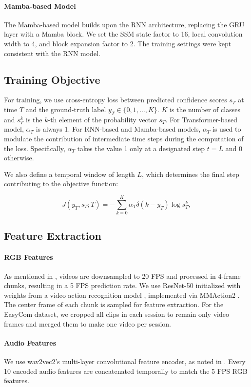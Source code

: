 \documentclass[11pt]{article}
\begin{document}
\paragraph{Mamba-based Model}
The Mamba-based model builds upon the RNN architecture, replacing the GRU layer with a Mamba block. We set the SSM state factor to 16, local convolution width to 4, and block expansion factor to 2. The training settings were kept consistent with the RNN model.

\subsection{Training Objective}
For training, we use cross-entropy loss between predicted confidence scores $s_T$ at time $T$ and the ground-truth label $y_T \in \{0, 1, \ldots, K\}$. $K$ is the number of classes and $s^k_T$ is the $k$-th element of the probability vector $s_T$. For Transformer-based model, $\alpha_T$ is always 1. For RNN-based and Mamba-based models, $\alpha_T$ is used to modulate the contribution of intermediate time steps during the computation of the loss. Specifically, $\alpha_T$ takes the value 1 only at a designated step $t = L$ and 0 otherwise.

We also define a temporal window of length $L$, which determines the final step contributing to the objective function:

$$J(y_T, s_T; T) = - \sum_{k=0}^K \alpha_T\delta(k - y_T) \log s_T^k,$$

\subsection{Feature Extraction}
\label{app:feature_extraction}
\paragraph{RGB Features} As mentioned in , videos are downsampled to 20 FPS and processed in 4-frame chunks, resulting in a 5 FPS prediction rate. We use ResNet-50 \cite{he2016resnet} initialized with weights from a video action recognition model \cite{wang2016temporal}, implemented via MMAction2 \cite{2020mmaction2}. The center frame of each chunk is sampled for feature extraction. For the EasyCom dataset, we cropped all clips in each session to remain only video frames and merged them to make one video per session.
\paragraph{Audio Features} We use wav2vec2's \cite{baevski2020wav2vec} multi-layer convolutional feature encoder, as noted in . Every 10 encoded audio features are concatenated temporally to match the 5 FPS RGB features.
\end{document}
